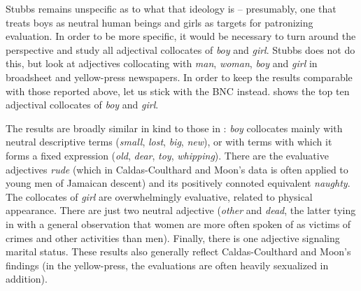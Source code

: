 Stubbs remains unspecific as to what that ideology  is -- presumably, one that treats boys as neutral human beings and girls as targets for patronizing evaluation.  In order to be more specific, it would be necessary to turn around the perspective and study all adjectival  collocates  of \textit{boy} and \textit{girl}. Stubbs does not do this, but \citet{caldas-coulthard_curvy_2010} look at adjectives  collocating with \textit{man}, \textit{woman}, \textit{boy} and \textit{girl} in broadsheet and yellow\hyp{}press newspapers.  In order to keep the results comparable with those reported above, let us stick with the BNC  instead.  shows the top ten adjectival  collocates  of \textit{boy} and \textit{girl}.

The results are broadly similar in kind to those in \citet{caldas-coulthard_curvy_2010}: \textit{boy} collocates  mainly with neutral descriptive terms (\textit{small}, \textit{lost}, \textit{big}, \textit{new}), or with terms with which it forms a fixed expression (\textit{old}, \textit{dear}, \textit{toy}, \textit{whipping}). There are the evaluative adjectives  \textit{rude} (which in Caldas\hyp{}Coulthard and Moon's data is often applied to young men of Jamaican descent) and its positively connoted  equivalent \textit{naughty}.  The collocates  of \textit{girl} are overwhelmingly evaluative, related to physical appearance. There are just two neutral adjective  (\textit{other} and \textit{dead}, the latter tying in with a general observation that women are more often spoken of as victims of crimes and other activities than men). Finally, there is one adjective  signaling marital status. These results also generally reflect Caldas\hyp{}Coulthard and Moon's findings (in the yellow\hyp{}press, the evaluations are often heavily sexualized in addition).\pagebreak\largerpage[2]

